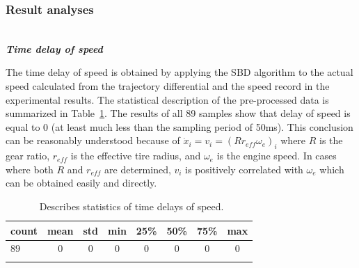 \documentclass[journal]{IEEEtran}
\begin{document}
\subsubsection{Result analyses}
\label{Section 3.2.2}

~\\

\textbf{\emph{Time delay of speed}}


The time delay of speed is obtained by applying the SBD algorithm to the actual speed calculated from the trajectory differential and the speed record in the experimental results. The statistical description of the pre-processed data is summarized in Table~\ref{table2}. The results of all 89 samples show that delay of speed is equal to 0 (at least much less than the sampling period of 50ms). This conclusion can be reasonably understood because of ${\dot{x}}_i=v_i=\left(Rr_{eff}\omega_e\right)_i$ where $R$ is the gear ratio, $r_{eff}$ is the effective tire radius, and $\omega_e$ is the engine speed. In cases where both $R$ and $r_{eff}$ are determined, $v_i$ is positively correlated with $\omega_e$ which can be obtained easily and directly.


\begin{table}
  \centering
  \setlength{\abovecaptionskip}{0pt}
  \setlength{\belowcaptionskip}{10pt}%
  \caption{~Describes statistics of time delays of speed.}
  {\begin{tabular}{lccccccc} \toprule      count & mean & std & min & 25\% & 50\% & 75\% & max \\ \midrule
               $89$                           & $0$  & $0$ & $0$ & $0$  & $0$  & $0$  & $0$ \\
               \bottomrule
               \label{table2}
    \end{tabular}}
\end{table}
\end{document}

